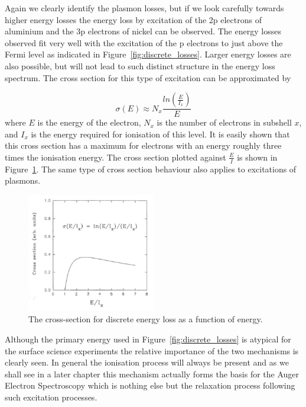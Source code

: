 Again we clearly identify the plasmon losses, but if we look carefully towards higher energy losses the energy loss by excitation of the 2p electrons of aluminium and the 3p electrons of nickel can be observed. The energy losses observed fit very well with the excitation of the p electrons to just above the Fermi level as indicated in Figure~\ref{fig:discrete_losses}. Larger energy losses are also possible, but will not lead to such distinct structure in the energy loss spectrum. The cross section for this type of excitation can be approximated by

\begin{equation}
\sigma(E) \approx N_x\frac{ln(\frac{E}{I_x})}{E}
\end{equation}
where $E$ is the energy of the electron, $N_x$ is the number of electrons in subshell $x$, and $I_x$ is the energy required for ionisation of this level. It is easily shown that this cross section has a maximum for electrons with an energy roughly three times the ionisation energy. The cross section plotted against $\frac{E}{I}$ is shown in Figure~\ref{fig:discrete_losses_crosssection}. The same type of cross section behaviour also applies to excitations of plasmons.

\begin{figure}[htbp]
\centering
\includegraphics[width=0.5\textwidth]{figures/02_11}
\caption{The cross-section for discrete energy loss as a function of energy.}
\label{fig:discrete_losses_crosssection}
\end{figure}

Although the primary energy used in Figure~\ref{fig:discrete_losses} is atypical for the surface science experiments the relative importance of the two mechanisms is clearly seen. In general the ionisation process will always be present and as we shall see in a later chapter this mechanism actually forms the basis for the Auger Electron Spectroscopy which is nothing else but the relaxation process following such excitation processes.

